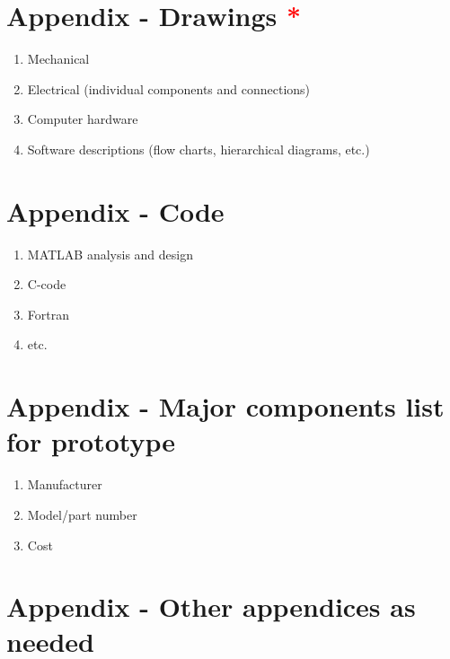 \documentclass[]{aiaa-tc}%
\newcommand{\reqd}{\textcolor{red}{*}}
\begin{document}
\appendix
\section{Appendix - Drawings \reqd}
\begin{enumerate}
\item Mechanical
\item Electrical (individual components and connections)
\item Computer hardware
\item Software descriptions (flow charts, hierarchical diagrams, etc.)
\end{enumerate}
\section{Appendix - Code}
\begin{enumerate}
\item MATLAB analysis and design
\item C-code
\item Fortran
\item etc.
\end{enumerate}

\section{Appendix - Major components list for prototype}
\begin{enumerate}
\item Manufacturer
\item Model/part number
\item Cost
\end{enumerate}

\section{Appendix - Other appendices as needed}
\end{document}
